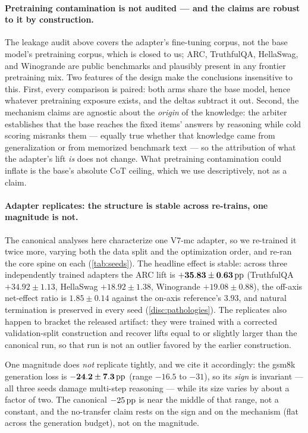 \paragraph{Pretraining contamination is not audited --- and the claims are robust
to it by construction.}
The leakage audit above covers the adapter's fine-tuning corpus, not the base
model's pretraining corpus, which is closed to us; ARC, TruthfulQA, HellaSwag, and
Winogrande are public benchmarks and plausibly present in any frontier pretraining
mix. Two features of the design make the conclusions insensitive to this. First,
every comparison is paired: both arms share the base model, hence whatever
pretraining exposure exists, and the deltas subtract it out. Second, the mechanism
claims are agnostic about the \emph{origin} of the knowledge: the arbiter
establishes that the base reaches the fixed items' answers by reasoning while cold
scoring misranks them --- equally true whether that knowledge came from
generalization or from memorized benchmark text --- so the attribution of what the
adapter's lift \emph{is} does not change. What pretraining contamination could
inflate is the base's absolute CoT ceiling, which we use descriptively, not as a
claim.

\paragraph{Adapter replicates: the structure is stable across re-trains, one magnitude
is not.}
The canonical analyses here characterize one V7-mc adapter, so we re-trained it twice
more, varying both the data split and the optimization order, and re-ran the core
spine on each (\cref{tab:seeds}). The headline effect is stable: across three
independently trained adapters the ARC lift is $\mathbf{+35.83 \pm 0.63}\,\mathrm{pp}$
(TruthfulQA $+34.92 \pm 1.13$, HellaSwag $+18.92 \pm 1.38$, Winogrande
$+19.08 \pm 0.88$), the off-axis net-effect ratio is $\mathbf{1.85 \pm 0.14}$ against
the on-axis reference's $3.93$, and natural termination is preserved in every seed
(\cref{disc:pathologies}). The replicates also happen to bracket the released
artifact: they were trained with a corrected validation-split construction and recover
lifts equal to or slightly larger than the canonical run, so that run is not an
outlier favored by the earlier construction.

One magnitude does \emph{not} replicate tightly, and we cite it accordingly: the
gsm8k generation loss is $\mathbf{-24.2 \pm 7.3}\,\mathrm{pp}$ (range $-16.5$ to $-31$), so its
\emph{sign} is invariant --- all three seeds damage multi-step reasoning --- while its
size varies by about a factor of two. The canonical $-25\,\mathrm{pp}$ is near the middle of
that range, not a constant, and the no-transfer claim rests on the sign and on the
mechanism (flat across the generation budget), not on the magnitude.

